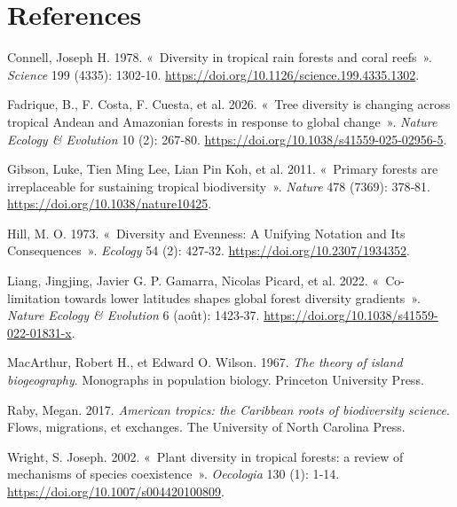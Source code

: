 \documentclass[
  french,
  11pt,
]{stylisharticle}
\newlength{\cslhangindent}
\newenvironment{CSLReferences}[2] %
 {\begin{list}{}{%
  \setlength{\itemindent}{0pt}
  \setlength{\leftmargin}{0pt}
  \setlength{\parsep}{0pt}
  \ifodd #1
   \setlength{\leftmargin}{\cslhangindent}
   \setlength{\itemindent}{-1\cslhangindent}
  \fi
  \setlength{\itemsep}{#2\baselineskip}}}
 {\end{list}}
\begin{document}
\section*{References}\label{bibliography}

\protect{}\label{refs}
\begin{CSLReferences}{1}{1}
Connell, Joseph H. 1978. {«~Diversity in tropical rain forests and coral
reefs~»}. \emph{Science} 199 (4335): 1302‑10.
\url{https://doi.org/10.1126/science.199.4335.1302}.

{Fadrique, B., F. Costa, F. Cuesta, et al.} 2026. {«~Tree diversity is
changing across tropical Andean and Amazonian forests in response to
global change~»}. \emph{Nature Ecology \& Evolution} 10 (2): 267‑80.
\url{https://doi.org/10.1038/s41559-025-02956-5}.

{Gibson, Luke, Tien Ming Lee, Lian Pin Koh, et al.} 2011. {«~Primary
forests are irreplaceable for sustaining tropical biodiversity~»}.
\emph{Nature} 478 (7369): 378‑81.
\url{https://doi.org/10.1038/nature10425}.

Hill, M. O. 1973. {«~Diversity and Evenness: A Unifying Notation and Its
Consequences~»}. \emph{Ecology} 54 (2): 427‑32.
\url{https://doi.org/10.2307/1934352}.

{Liang, Jingjing, Javier G. P. Gamarra, Nicolas Picard, et al.} 2022.
{«~Co-limitation towards lower latitudes shapes global forest diversity
gradients~»}. \emph{Nature Ecology \& Evolution} 6 (août): 1423‑37.
\url{https://doi.org/10.1038/s41559-022-01831-x}.

MacArthur, Robert H., et Edward O. Wilson. 1967. \emph{The theory of
island biogeography}. Monographs in population biology. Princeton
University Press.

Raby, Megan. 2017. \emph{American tropics: the Caribbean roots of
biodiversity science}. Flows, migrations, et exchanges. The University
of North Carolina Press.

Wright, S. Joseph. 2002. {«~Plant diversity in tropical forests: a
review of mechanisms of species coexistence~»}. \emph{Oecologia} 130
(1): 1‑14. \url{https://doi.org/10.1007/s004420100809}.

\end{CSLReferences}
\end{document}
